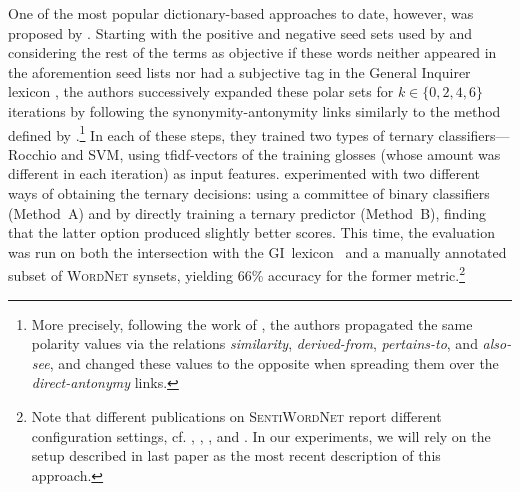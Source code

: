 One of the most popular dictionary-based approaches to date, however,
was proposed by \citet{Esuli:06c}.  Starting with the positive and
negative seed sets used by \citet{Turney:03} and considering the rest
of the terms as objective if these words neither appeared in the
aforemention seed lists nor had a subjective tag in the General
Inquirer lexicon \cite{Stone:66}, the authors successively expanded
these polar sets for $k \in \{0, 2, 4, 6\}$ iterations by following
the synonymity-antonymity links similarly to the method defined by
\citet{Hu:04}.\footnote{More precisely, following the work of
  \citet{Strapparava:04}, the authors propagated the same polarity
  values via the relations \emph{similarity}, \emph{derived-from},
  \emph{pertains-to}, and \emph{also-see}, and changed these values to
  the opposite when spreading them over the \emph{direct-antonymy}
  links.}  In each of these steps, they trained two types of ternary
classifiers---Rocchio and SVM, using tfidf-vectors of the training
glosses (whose amount was different in each iteration) as input
features.  \citet{Esuli:06c} experimented with two different ways of
obtaining the ternary decisions: using a committee of binary
classifiers (Method~A) and by directly training a ternary predictor
(Method~B), finding that the latter option produced slightly better
scores.  This time, the evaluation was run on both the intersection
with the GI~lexicon~\cite{Stone:66} and a manually annotated subset of
\textsc{WordNet} synsets, yielding 66\% accuracy for the former
metric.\footnote{Note that different publications on
  \textsc{SentiWordNet} report different configuration settings,
  cf. \cite{Esuli:05}, \citet{Esuli:06a}, \citet{Esuli:06b}, and
  \citet{Esuli:06c}.  In our experiments, we will rely on the setup
  described in last paper as the most recent description of this
  approach.}


\cite{Kim:06}

\cite{Blair-Goldensohn:08}


